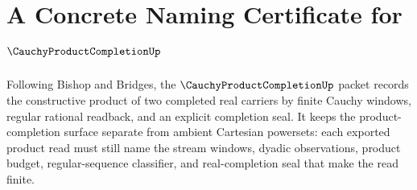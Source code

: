 \chapter{A Concrete Naming Certificate for $\CauchyProductCompletionUp$}
\label{ch:concrete-instances-cauchy-product-completion-namecert}

Following Bishop and Bridges, the $\CauchyProductCompletionUp$ packet records the constructive product of two completed real carriers by finite Cauchy windows, regular rational readback, and an explicit completion seal. It keeps the product-completion surface separate from ambient Cartesian powersets: each exported product read must still name the stream windows, dyadic observations, product budget, regular-sequence classifier, and real-completion seal that make the read finite.

